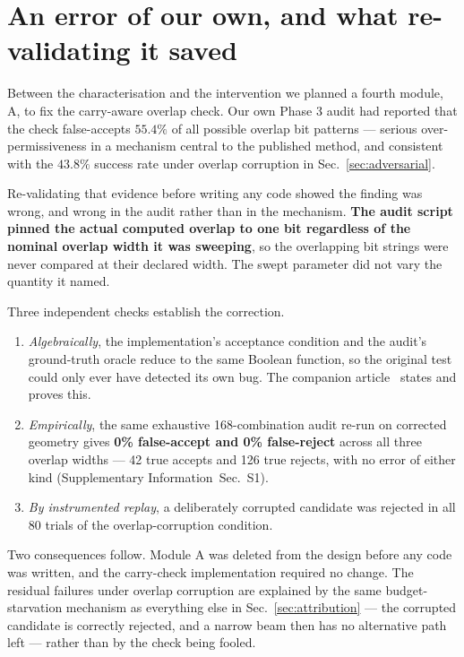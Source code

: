 \documentclass[preprint,11pt]{elsarticle}
\newcommand{\SI}{Supplementary Information}
\newcommand{\SIaudit}{\SI{}~Sec.~S1}
\begin{document}
\section{An error of our own, and what re-validating it saved}
\label{sec:retraction}

Between the characterisation and the intervention we planned a fourth
module, A, to fix the carry-aware overlap check. Our own Phase 3 audit had
reported that the check false-accepts $55.4\%$ of all possible overlap bit
patterns --- serious over-permissiveness in a mechanism central to the
published method, and consistent with the $43.8\%$ success rate under
overlap corruption in Sec.~\ref{sec:adversarial}.

Re-validating that evidence before writing any code showed the finding was
wrong, and wrong in the audit rather than in the mechanism. \textbf{The audit
script pinned the actual computed overlap to one bit regardless of the
nominal overlap width it was sweeping}, so the overlapping bit strings were
never compared at their declared width. The swept parameter did not vary the
quantity it named.

Three independent checks establish the correction.

\begin{enumerate}\itemsep2pt
\item \emph{Algebraically}, the implementation's acceptance condition and the
audit's ground-truth oracle reduce to the same Boolean function, so the
original test could only ever have detected its own bug. The companion
article~\cite{methodpaper} states and proves this.
\item \emph{Empirically}, the same exhaustive 168-combination audit re-run on
corrected geometry gives \textbf{0\% false-accept and 0\% false-reject}
across all three overlap widths --- 42 true accepts and 126 true rejects,
with no error of either kind (\SIaudit{}).
\item \emph{By instrumented replay}, a deliberately corrupted candidate was
rejected in all 80 trials of the overlap-corruption condition.
\end{enumerate}

Two consequences follow. Module A was deleted from the design before any
code was written, and the carry-check implementation required no change. The
residual failures under overlap corruption are explained by the same
budget-starvation mechanism as everything else in Sec.~\ref{sec:attribution}
--- the corrupted candidate is correctly rejected, and a narrow beam then has
no alternative path left --- rather than by the check being fooled.
\end{document}
